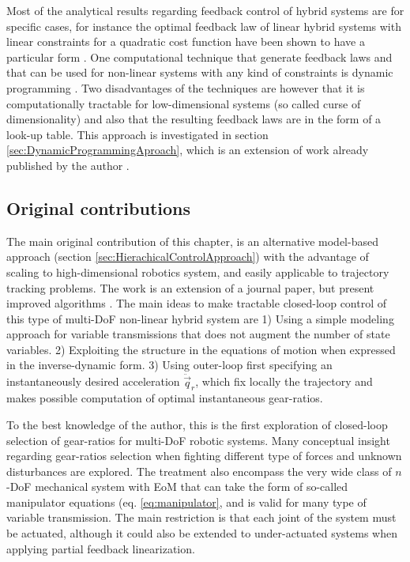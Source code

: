 Most of the analytical results regarding feedback control of hybrid systems are for specific cases, for instance the optimal feedback law of linear hybrid systems with linear constraints for a quadratic cost function have been shown to have a particular form \cite{borrelli_dynamic_2005}. One computational technique that generate feedback laws and that can be used for non-linear systems with any kind of constraints is dynamic programming \cite{donald_e._kirk_optimal_2004}. Two disadvantages of the techniques are however that it is computationally tractable for low-dimensional systems (so called curse of dimensionality) and also that the resulting feedback laws are in the form of a look-up table. This approach is investigated in section \ref{sec:DynamicProgrammingAproach}, which is an extension of work already published by the author \cite{girard_practical_2016}.

\subsection{Original contributions}
\label{sec:maincont}

The main original contribution of this chapter, is an alternative model-based approach (section \ref{sec:HierachicalControlApproach}) with the advantage of scaling to high-dimensional robotics system, and easily applicable to trajectory tracking problems. The work is an extension of a journal paper, but present improved algorithms \cite{girard_leveraging_2017}. The main ideas to make tractable closed-loop control of this type of multi-DoF non-linear hybrid system are 1) Using a simple modeling approach for variable transmissions that does not augment the number of state variables. 2) Exploiting the structure in the equations of motion when expressed in the inverse-dynamic form.  3) Using outer-loop first specifying an instantaneously desired acceleration $\ddot{\vec{q}}_r$, which fix locally the trajectory and makes possible computation of optimal instantaneous gear-ratios.

To the best knowledge of the author, this is the first exploration of closed-loop selection of gear-ratios for multi-DoF robotic systems. Many conceptual insight regarding gear-ratios selection when fighting different type of forces and unknown disturbances are explored. The treatment also encompass the very wide class of $n$-DoF mechanical system with EoM that can take the form of so-called manipulator equations (eq. \eqref{eq:manipulator}, and is valid for many type of variable transmission. The main restriction is that each joint of the system must be actuated, although it could also be extended to under-actuated systems when applying partial feedback linearization. 


